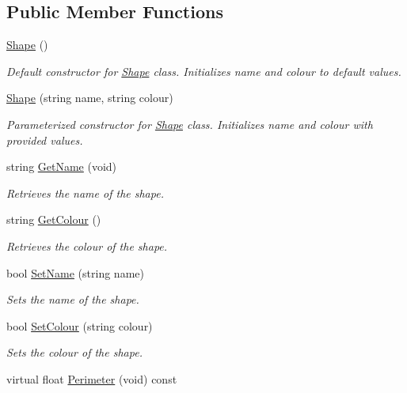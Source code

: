 \subsection*{Public Member Functions}
\begin{DoxyCompactItemize}
\item 
\mbox{\hyperlink{class_shape_aaa8d87171e65e0d8ba3c5459978992a7}{Shape}} ()
\begin{DoxyCompactList}\small\item\em Default constructor for \mbox{\hyperlink{class_shape}{Shape}} class. Initializes name and colour to default values. \end{DoxyCompactList}\item 
\mbox{\hyperlink{class_shape_ad735b927c63c190803e2b9af27e4c25d}{Shape}} (string name, string colour)
\begin{DoxyCompactList}\small\item\em Parameterized constructor for \mbox{\hyperlink{class_shape}{Shape}} class. Initializes name and colour with provided values. \end{DoxyCompactList}\item 
string \mbox{\hyperlink{class_shape_a7af8e23f8cce0f52e526b45b45818917}{Get\+Name}} (void)
\begin{DoxyCompactList}\small\item\em Retrieves the name of the shape. \end{DoxyCompactList}\item 
string \mbox{\hyperlink{class_shape_ada61754901b5db24dad569c5a54a567b}{Get\+Colour}} ()
\begin{DoxyCompactList}\small\item\em Retrieves the colour of the shape. \end{DoxyCompactList}\item 
bool \mbox{\hyperlink{class_shape_af47e082e8a48ae1c083d3acf0d7a059f}{Set\+Name}} (string name)
\begin{DoxyCompactList}\small\item\em Sets the name of the shape. \end{DoxyCompactList}\item 
bool \mbox{\hyperlink{class_shape_ae7f2ceebc1f1268cd733e75746046818}{Set\+Colour}} (string colour)
\begin{DoxyCompactList}\small\item\em Sets the colour of the shape. \end{DoxyCompactList}\item 
virtual float \mbox{\hyperlink{class_shape_a27f450f44fc4f9a444600b5df6754c5f}{Perimeter}} (void) const

\end{DoxyCompactItemize}
